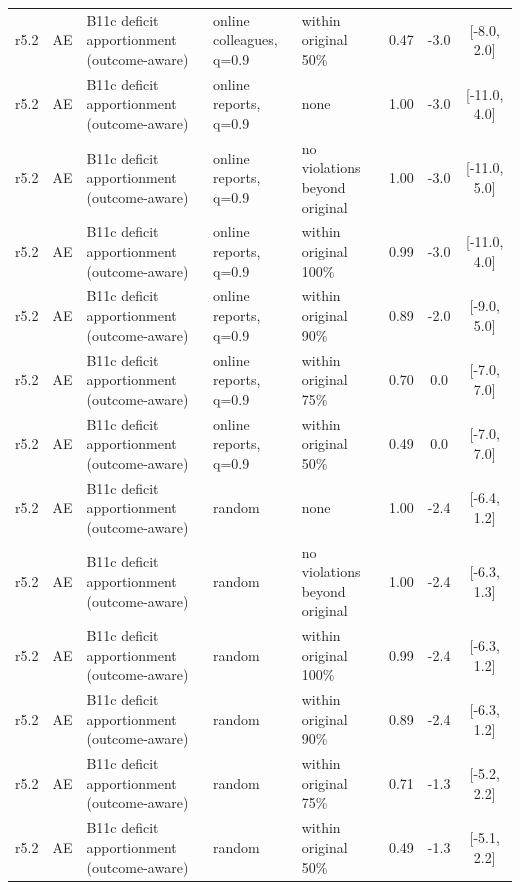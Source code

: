\begin{longtable}{lllp{4.2cm}p{3.4cm}ccc}
r5.2 & AE & B11c deficit apportionment (outcome-aware) & online colleagues, q=0.9 & within original 50\% & 0.47 & -3.0 & [-8.0, 2.0] \\
r5.2 & AE & B11c deficit apportionment (outcome-aware) & online reports, q=0.9 & none & 1.00 & -3.0 & [-11.0, 4.0] \\
r5.2 & AE & B11c deficit apportionment (outcome-aware) & online reports, q=0.9 & no violations beyond original & 1.00 & -3.0 & [-11.0, 5.0] \\
r5.2 & AE & B11c deficit apportionment (outcome-aware) & online reports, q=0.9 & within original 100\% & 0.99 & -3.0 & [-11.0, 4.0] \\
r5.2 & AE & B11c deficit apportionment (outcome-aware) & online reports, q=0.9 & within original 90\% & 0.89 & -2.0 & [-9.0, 5.0] \\
r5.2 & AE & B11c deficit apportionment (outcome-aware) & online reports, q=0.9 & within original 75\% & 0.70 & 0.0 & [-7.0, 7.0] \\
r5.2 & AE & B11c deficit apportionment (outcome-aware) & online reports, q=0.9 & within original 50\% & 0.49 & 0.0 & [-7.0, 7.0] \\
r5.2 & AE & B11c deficit apportionment (outcome-aware) & random & none & 1.00 & -2.4 & [-6.4, 1.2] \\
r5.2 & AE & B11c deficit apportionment (outcome-aware) & random & no violations beyond original & 1.00 & -2.4 & [-6.3, 1.3] \\
r5.2 & AE & B11c deficit apportionment (outcome-aware) & random & within original 100\% & 0.99 & -2.4 & [-6.3, 1.2] \\
r5.2 & AE & B11c deficit apportionment (outcome-aware) & random & within original 90\% & 0.89 & -2.4 & [-6.3, 1.2] \\
r5.2 & AE & B11c deficit apportionment (outcome-aware) & random & within original 75\% & 0.71 & -1.3 & [-5.2, 2.2] \\
r5.2 & AE & B11c deficit apportionment (outcome-aware) & random & within original 50\% & 0.49 & -1.3 & [-5.1, 2.2] \\
\bottomrule
\end{longtable}

